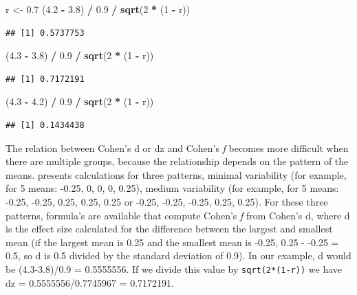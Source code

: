 \documentclass[]{book}
\newenvironment{Shaded}{\begin{snugshade}}{\end{snugshade}}
\newcommand{\DecValTok}[1]{\textcolor[rgb]{0.00,0.00,0.81}{#1}}
\newcommand{\FloatTok}[1]{\textcolor[rgb]{0.00,0.00,0.81}{#1}}
\newcommand{\KeywordTok}[1]{\textcolor[rgb]{0.13,0.29,0.53}{\textbf{#1}}}
\newcommand{\NormalTok}[1]{#1}
\newcommand{\OperatorTok}[1]{\textcolor[rgb]{0.81,0.36,0.00}{\textbf{#1}}}
\newcommand{\StringTok}[1]{\textcolor[rgb]{0.31,0.60,0.02}{#1}}
\begin{document}
\begin{Shaded}
\begin{Highlighting}[]
\NormalTok{  r <-}\StringTok{ }\FloatTok{0.7}
\NormalTok{  (}\FloatTok{4.2} \OperatorTok{-}\StringTok{ }\FloatTok{3.8}\NormalTok{) }\OperatorTok{/}\StringTok{ }\FloatTok{0.9} \OperatorTok{/}\StringTok{ }\KeywordTok{sqrt}\NormalTok{(}\DecValTok{2} \OperatorTok{*}\StringTok{ }\NormalTok{(}\DecValTok{1} \OperatorTok{-}\StringTok{ }\NormalTok{r))}
\end{Highlighting}
\end{Shaded}

\begin{verbatim}
## [1] 0.5737753
\end{verbatim}

\begin{Shaded}
\begin{Highlighting}[]
\NormalTok{  (}\FloatTok{4.3} \OperatorTok{-}\StringTok{ }\FloatTok{3.8}\NormalTok{) }\OperatorTok{/}\StringTok{ }\FloatTok{0.9} \OperatorTok{/}\StringTok{ }\KeywordTok{sqrt}\NormalTok{(}\DecValTok{2} \OperatorTok{*}\StringTok{ }\NormalTok{(}\DecValTok{1} \OperatorTok{-}\StringTok{ }\NormalTok{r))}
\end{Highlighting}
\end{Shaded}

\begin{verbatim}
## [1] 0.7172191
\end{verbatim}

\begin{Shaded}
\begin{Highlighting}[]
\NormalTok{  (}\FloatTok{4.3} \OperatorTok{-}\StringTok{ }\FloatTok{4.2}\NormalTok{) }\OperatorTok{/}\StringTok{ }\FloatTok{0.9} \OperatorTok{/}\StringTok{ }\KeywordTok{sqrt}\NormalTok{(}\DecValTok{2} \OperatorTok{*}\StringTok{ }\NormalTok{(}\DecValTok{1} \OperatorTok{-}\StringTok{ }\NormalTok{r))}
\end{Highlighting}
\end{Shaded}

\begin{verbatim}
## [1] 0.1434438
\end{verbatim}

The relation between Cohen's d or dz and Cohen's \emph{f} becomes more difficult when there are multiple groups, because the relationship depends on the pattern of the means. \citet{cohen1988spa} presents calculations for three patterns, minimal variability (for example, for 5 means: -0.25, 0, 0, 0, 0.25), medium variability (for example, for 5 means: -0.25, -0.25, 0.25, 0.25, 0.25 or -0.25, -0.25, -0.25, 0.25, 0.25). For these three patterns, formula's are available that compute Cohen's \emph{f} from Cohen's d, where d is the effect size calculated for the difference between the largest and smallest mean (if the largest mean is 0.25 and the smallest mean is -0.25, 0.25 - -0.25 = 0.5, so d is 0.5 divided by the standard deviation of 0.9). In our example, d would be (4.3-3.8)/0.9 = 0.5555556. If we divide this value by \texttt{sqrt(2*(1-r))} we have dz = 0.5555556/0.7745967 = 0.7172191.
\end{document}

